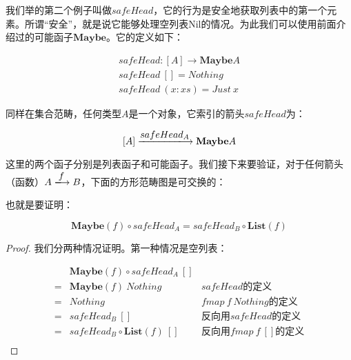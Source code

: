 \documentclass{article}
\begin{document}
\begin{example}
我们举的第二个例子叫做$safeHead$，它的行为是安全地获取列表中的第一个元素。所谓“安全”，就是说它能够处理空列表Nil的情况。为此我们可以使用前面介绍过的可能函子$\mathbf{Maybe}$。它的定义如下：

\[
\begin{array}{l}
safeHead : [A] \to \mathbf{Maybe} A \\
safeHead\ [] = Nothing \\
safeHead\ (x:xs) = Just\ x
\end{array}
\]

同样在集合范畴，任何类型$A$是一个对象，它索引的箭头$safeHead$为：

\[
[A] \arrowto{safeHead_A} \mathbf{Maybe} A
\]

这里的两个函子分别是列表函子和可能函子。我们接下来要验证，对于任何箭头（函数）$A \arrowto{f} B$，下面的方形范畴图是可交换的：

\begin{center}
\end{center}

也就是要证明：

\[
  \mathbf{Maybe}(f) \circ safeHead_A = safeHead_B \circ \mathbf{List}(f)
\]

\begin{proof}
我们分两种情况证明。第一种情况是空列表：

\[
\begin{array}{cll}
  & \mathbf{Maybe}(f) \circ safeHead_A\ [] & \\
= & \mathbf{Maybe}(f)\ Nothing & \text{$safeHead$的定义} \\
= & Nothing & \text{$fmap\ f\ Nothing$的定义} \\
= & safeHead_B\ [] & \text{反向用$safeHead$的定义} \\
= & safeHead_B \circ \mathbf{List}(f)\ [] & \text{反向用$fmap\ f\ []$的定义} \\
\end{array}
\]


\end{proof}
\end{example}
\end{document}
